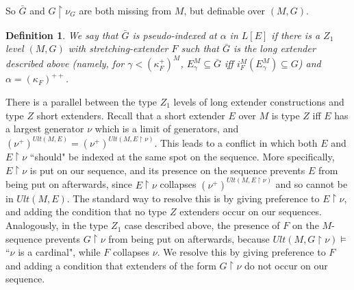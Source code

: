 \documentclass[12pt]{article}
\newtheorem{defn}[thm]{Definition}
\begin{document}
So $\bar{G}$ and $G \restriction \nu_G$ are both missing from $M$, but definable over $(M, G)$.\\

\begin{defn} \label{pseudoindex}
We say that $\bar{G}$ is pseudo-indexed at $\alpha$ in $L[E]$ if there is a $Z_1$ level $(M, G)$ with stretching-extender $F$ such that $\bar{G}$ is the long extender described above (namely, for $\gamma < (\kappa_F ^+)^M$, $E_\gamma ^M \subseteq \bar{G}$ iff $i_F ^M (E_\gamma ^M) \subseteq G$) and $\alpha = (\kappa_F)^{++}$.
\end{defn}

There is a parallel between the type $Z_1$ levels of long extender constructions and type $Z$ short extenders.  Recall that a short extender $E$ over $M$ is type $Z$ iff $E$ has a largest generator $\nu$ which is a limit of generators, and $(\nu^+)^{Ult(M, E)} = ( \nu^+ )^{Ult (M , E \restriction \nu )}$.  This leads to a conflict in which both $E$ and $E \restriction \nu$ ``should" be indexed at the same spot on the sequence.  More specifically, $E \restriction \nu$ is put on our sequence, and its presence on the sequence prevents $E$ from being put on afterwards, since $E \restriction \nu$ collapses $(\nu^+)^{Ult(M, E \restriction \nu )}$ and so cannot be in $Ult(M , E)$.  The standard way to resolve this is by giving preference to $E \restriction \nu$, and adding the condition that no type $Z$ extenders occur on our sequences.  Analogously, in the type $Z_1$ case described above, the presence of $F$ on the $M$-sequence prevents $G \restriction \nu$ from being put on afterwards, because $Ult ( M, G \restriction \nu ) \models$ ``$\nu$ is a cardinal", while $F$ collapses $\nu$.  We resolve this by giving preference to $F$ and adding a condition that extenders of the form $G \restriction \nu$ do not occur on our sequence.\\
\end{document}
